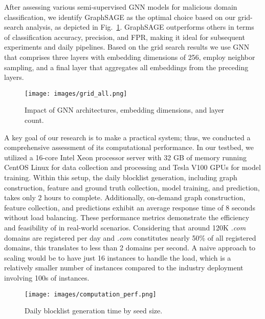 After assessing various semi-supervised GNN models for malicious domain classification, we identify GraphSAGE as the optimal choice based on our grid-search analysis, as depicted in Fig.~\ref{fig:grid_search}. GraphSAGE outperforms others in terms of classification accuracy, precision, and FPR, making it ideal for subsequent experiments and daily pipelines. Based on the grid search results we use GNN that comprises three layers with embedding dimensions of 256, employ neighbor sampling, and a final layer that aggregates all embeddings from the preceding layers. 

\begin{figure}[ht]
\centering
\texttt{[image: images/grid\_all.png]}
\caption{Impact of GNN architectures, embedding dimensions, and layer count.}
\label{fig:grid_search}
\end{figure}

A key goal of our research is to make \system a practical system; thus, we conducted a comprehensive assessment of its computational performance. In our testbed, we utilized a 16-core Intel Xeon processor server with 32 GB of memory running CentOS Linux for data collection and processing and Tesla V100 GPUs for model training. Within this setup, the daily blocklist generation, including graph construction, feature and ground truth collection, model training, and prediction, takes only 2 hours to complete. Additionally, on-demand graph construction, feature collection, and predictions exhibit an average response time of 8 seconds without load balancing. These performance metrics demonstrate the efficiency and feasibility of \system in real-world scenarios. Considering that around 120K \textit{.com} domains are registered per day and \textit{.com} constitutes nearly 50\% of all registered domains, this translates to less than 2 domains per second. A naive approach to scaling would be to have just 16 instances to handle the load, which is a relatively smaller number of instances compared to the industry deployment involving 100s of instances.

\begin{figure}
\centering
\texttt{[image: images/computation\_perf.png]}
\caption{Daily blocklist generation time by seed size.}
\label{fig:comp_perf}
\end{figure}

